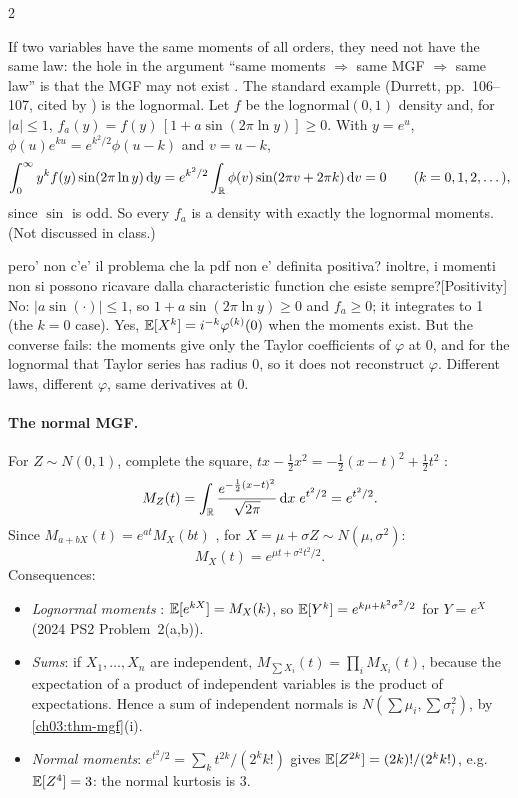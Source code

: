 \begin{paracol}{2}
\begin{remark}
If two variables have the same moments of all orders, they need not have the same law: the hole in the
argument ``same moments $\Rightarrow$ same MGF $\Rightarrow$ same law'' is that the MGF may not exist
. The standard example (Durrett, pp.~106--107, cited by ) is the
lognormal. Let $f$ be the lognormal$(0,1)$ density and, for $|a|\le1$, $f_a(y)=f(y)\,[1+a\sin(2\pi\ln y)]\ge0$.
With $y=e^u$, $\phi(u)e^{ku}=e^{k^2/2}\phi(u-k)$ and $v=u-k$,
\[
  \int_0^\infty y^kf(y)\sin(2\pi\ln y)\,\mathrm{d} y=e^{k^2/2}\int_{\mathbb{R}}\phi(v)\sin(2\pi v+2\pi k)\,\mathrm{d} v=0
  \qquad(k=0,1,2,\dots),
\]
since $\sin$ is odd. So every $f_a$ is a density with exactly the lognormal moments. (Not discussed in class.)
\end{remark}\begin{answer}{pero' non c'e' il problema che la pdf non e' definita positiva? inoltre, i momenti non si possono ricavare dalla characteristic function che esiste sempre?}[Positivity]
No: $|a\sin(\cdot)|\le1$, so $1+a\sin(2\pi\ln y)\ge0$ and $f_a\ge0$; it integrates to 1 (the $k=0$ case).
Yes, $\mathbb{E}[X^k]=i^{-k}\varphi^{(k)}(0)$ when the moments exist. But the converse fails: the moments give only
the Taylor coefficients of $\varphi$ at 0, and for the lognormal that Taylor series has radius 0, so it
does not reconstruct $\varphi$. Different laws, different $\varphi$, same derivatives at 0.
\end{answer}

\paragraph{The normal MGF.} For $Z\sim N(0,1)$, complete the square, $tx-\tfrac12x^2=-\tfrac12(x-t)^2+\tfrac12t^2$
:
\[
  M_Z(t)=\int_{\mathbb{R}}\frac{e^{-\frac12(x-t)^2}}{\sqrt{2\pi}}\,\mathrm{d} x\;e^{t^2/2}=e^{t^2/2}.
\]
Since $M_{a+bX}(t)=e^{at}M_X(bt)$ , for $X=\mu+\sigma Z\sim N(\mu,\sigma^2)$:
\begin{equation}\label{ch03:eq-normalmgf}
  M_X(t)=e^{\mu t+\sigma^2t^2/2}.
\end{equation}
Consequences:
\begin{itemize}
  \item \emph{Lognormal moments} : $\mathbb{E}[e^{kX}]=M_X(k)$, so $\mathbb{E}[Y^k]=e^{k\mu+k^2\sigma^2/2}$ for
        $Y=e^X$ (2024 PS2 Problem~2(a,b)).
  \item \emph{Sums}: if $X_1,\dots,X_n$ are independent, $M_{\sum X_i}(t)=\prod_iM_{X_i}(t)$, because the expectation of a
        product of independent variables is the product of expectations. Hence a sum of independent normals
        is $N(\sum\mu_i,\sum\sigma_i^2)$, by \cref{ch03:thm-mgf}(i).
  \item \emph{Normal moments}: $e^{t^2/2}=\sum_k t^{2k}/(2^kk!)$ gives $\mathbb{E}[Z^{2k}]=(2k)!/(2^kk!)$, e.g.\ $\mathbb{E}[Z^4]=3$:
        the normal kurtosis is $3$.
\end{itemize}


\end{paracol}

